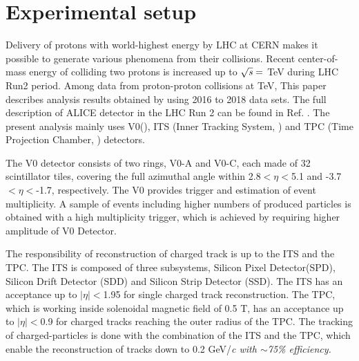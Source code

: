 \documentclass[ALICE,manyauthors]{cernphprep}
\begin{document}

\section{Experimental setup}

Delivery of protons with world-highest energy by LHC at CERN makes it possible to generate various phenomena from their collisions. Recent center-of-mass energy of colliding two protons is increased up to $\sqrt{\it{s}} =$ \unit[13]{TeV} during LHC Run2 period. Among data from proton-proton collisions at \unit[13]{TeV}, This paper describes analysis results obtained by using 2016 to 2018 data sets. The full description of ALICE detector in the LHC Run 2 can be found in Ref. \cite{ALICEdet}. The present analysis mainly uses V0(\cite{VZEROpaper}), ITS (Inner Tracking System, \cite{ITSpaper}) and TPC (Time Projection Chamber, \cite{TPCpaper}) detectors.

The V0 detector consists of two rings, V0-A and V0-C, each made of 32 scintillator tiles, covering the full azimuthal angle within 2.8$<\eta<$5.1 and -3.7$<\eta<$-1.7, respectively. The V0 provides trigger and estimation of event multiplicity. A sample of events including higher numbers of produced particles is obtained with a high multiplicity trigger, which is achieved by requiring higher amplitude of V0 Detector. 

The responsibility of reconstruction of charged track is up to the ITS and the TPC. The ITS is composed of three subsystems, Silicon Pixel Detector(SPD), Silicon Drift Detector (SDD) and Silicon Strip Detector (SSD). The ITS has an acceptance up to $|\eta|<$1.95 for single charged track reconstruction. The TPC, which is working inside solenoidal magnetic field of 0.5 T, has an acceptance up to $|\eta|<$0.9 for charged tracks reaching the outer radius of the TPC. The tracking of charged-particles is done with the combination of the ITS and the TPC, which enable the reconstruction of tracks down to 0.2 GeV/\it{c}\rm{} with $\sim$75\% efficiency.
\end{document}
